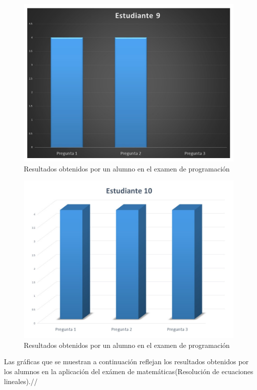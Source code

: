 \documentclass[12pt] {report}
\begin{document}
\begin{figure}[H]
\centering 
\includegraphics[scale=.4]{PEstudiante9.JPG}
\caption{Resultados obtenidos por un alumno en el examen de programación}
\end{figure}

\begin{figure}[H]
\centering 
\includegraphics[scale=.4]{PEstudiante10.JPG}
\caption{Resultados obtenidos por un alumno en el examen de programación}
\end{figure}

Las gráficas que se muestran a continuación reflejan los resultados obtenidos por los alumnos en la aplicación del exámen de matemáticas(Resolución de ecuaciones lineales).//
\end{document}
